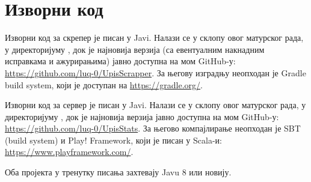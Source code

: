 \chapter{Изворни код}\label{ch:V}

Изворни код за скрепер је писан у Javi. Налази се у склопу овог матурског рада, у директоријуму , док је најновија верзија (са евентуалним накнадним исправкама и ажурирањима) јавно доступна на мом GitHub-у: \url{https://github.com/luq-0/UpisScrapper}. За његову изградњу неопходан је Gradle build system, који је доступан на \url{https://gradle.org/}.

Изворни код за сервер је писан у Javi. Налази се у склопу овог матурског рада, у директоријуму , док је најновија верзија јавно доступна на мом GitHub-у: \url{https://github.com/luq-0/UpisStats}. За његово компајлирање неопходан је SBT (build system) и Play! Framework, који је писан у Scala-и: \url{https://www.playframework.com/}.

Оба пројекта у тренутку писања захтевају Javu 8 или новију. %